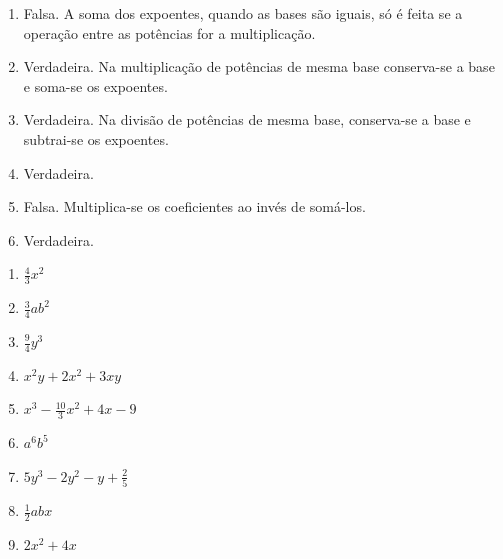 \begin{description}
\begin{enumerate}[label=\thesection.2.\arabic*]
        \ansitem{} \begin{enumerate}[label=\alph*)]
            \item Falsa. A soma dos expoentes, quando as bases são iguais, só é feita se a operação entre as potências for a multiplicação.
            
            \item Verdadeira. Na multiplicação de potências de mesma base conserva-se a base e soma-se os expoentes.
            
            \item Verdadeira. Na divisão de potências de mesma base, conserva-se a base e subtrai-se os expoentes.
            
            \item Verdadeira.
            
            \item Falsa. Multiplica-se os coeficientes ao invés de somá-los.
            
            \item Verdadeira.
        \end{enumerate}
        
        \ansitem{} \begin{multicols}{3}
            \begin{enumerate}[label=\alph*)]
                \item $\frac{4}{3}x^2$
                
                \item $\frac{3}{4}ab^2$
                
                \item $\frac{9}{4}y^3$
                
                \item $x^2y+2x^2+3xy$
                
                \item $x^3-\frac{10}{3}x^2+4x-9$
                
                \item $a^6b^5$
                
                \item $5y^3-2y^2-y+\frac{2}{5}$
                
                \item $\frac{1}{2}abx$
                
                \item $2x^2+4x$
                

\end{enumerate}
\end{multicols}
\end{enumerate}
\end{description}
